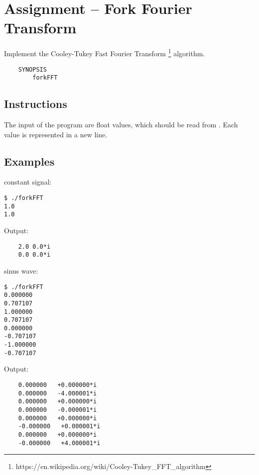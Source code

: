
\usepackage{amsmath}



\section*{ Assignment -- Fork Fourier Transform}
Implement the Cooley-Tukey Fast Fourier Transform \footnote{https://en.wikipedia.org/wiki/Cooley-Tukey\_FFT\_algorithm} algorithm.
\begin{verbatim}
    SYNOPSIS
        forkFFT
\end{verbatim}

\subsection*{Instructions}
The input of the program are float values, which should be read from . Each value is represented in a new line.
\subsection*{Examples}
constant signal:
\begin{verbatim}
$ ./forkFFT
1.0
1.0
\end{verbatim}
Output: 
\begin{verbatim}
	2.0	0.0*i
	0.0	0.0*i
\end{verbatim}
sinus wave:
\begin{verbatim}
$ ./forkFFT
0.000000
0.707107
1.000000
0.707107
0.000000
-0.707107
-1.000000
-0.707107
\end{verbatim}
Output: 
\begin{verbatim}
 	0.000000   +0.000000*i
 	0.000000   -4.000001*i
 	0.000000   +0.000000*i
 	0.000000   -0.000001*i
 	0.000000   +0.000000*i
 	-0.000000   +0.000001*i
 	0.000000   +0.000000*i
 	-0.000000   +4.000001*i
\end{verbatim}
